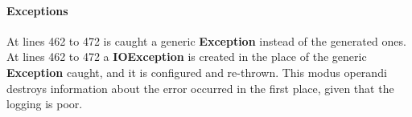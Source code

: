 \paragraph{Exceptions}
\begin{itemize}
		At lines 462 to 472 is caught a generic \textbf{Exception} instead of the generated ones.
		At lines 462 to 472 a \textbf{IOException} is created in the place of the generic \textbf{Exception} caught, and it is configured and re-thrown.
		This modus operandi destroys information about the error occurred in the first place, given that the logging is poor.
\end{itemize}
%
%
